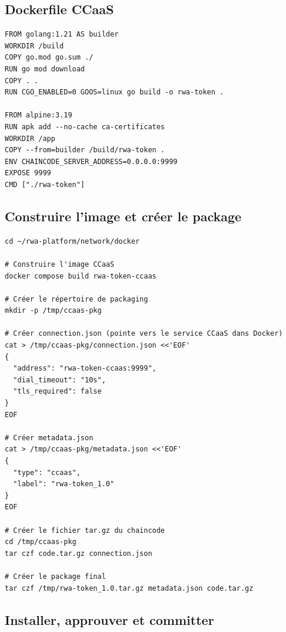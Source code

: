 \documentclass[12pt,a4paper,french]{article}
\begin{document}
\subsection{Dockerfile CCaaS}

\begin{lstlisting}[style=bash, caption={chaincode/rwa-token/Dockerfile.ccaas}]
FROM golang:1.21 AS builder
WORKDIR /build
COPY go.mod go.sum ./
RUN go mod download
COPY . .
RUN CGO_ENABLED=0 GOOS=linux go build -o rwa-token .

FROM alpine:3.19
RUN apk add --no-cache ca-certificates
WORKDIR /app
COPY --from=builder /build/rwa-token .
ENV CHAINCODE_SERVER_ADDRESS=0.0.0.0:9999
EXPOSE 9999
CMD ["./rwa-token"]
\end{lstlisting}

\subsection{Construire l'image et créer le package}

\begin{lstlisting}[style=bash, caption={Build et package chaincode}]
cd ~/rwa-platform/network/docker

# Construire l'image CCaaS
docker compose build rwa-token-ccaas

# Créer le répertoire de packaging
mkdir -p /tmp/ccaas-pkg

# Créer connection.json (pointe vers le service CCaaS dans Docker)
cat > /tmp/ccaas-pkg/connection.json <<'EOF'
{
  "address": "rwa-token-ccaas:9999",
  "dial_timeout": "10s",
  "tls_required": false
}
EOF

# Créer metadata.json
cat > /tmp/ccaas-pkg/metadata.json <<'EOF'
{
  "type": "ccaas",
  "label": "rwa-token_1.0"
}
EOF

# Créer le fichier tar.gz du chaincode
cd /tmp/ccaas-pkg
tar czf code.tar.gz connection.json

# Créer le package final
tar czf /tmp/rwa-token_1.0.tar.gz metadata.json code.tar.gz
\end{lstlisting}

\subsection{Installer, approuver et committer}
\end{document}
